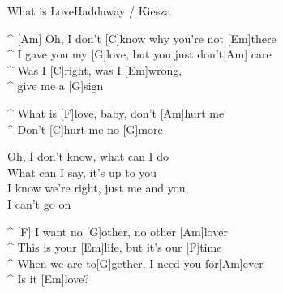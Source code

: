 \begin{song}{What is Love}{Haddaway / Kiesza}


\begin{guitar}
^ [Am]  Oh, I don't [C]know why you're not [Em]there \\
^ I gave you my [G]love, but you just don't[Am] care \\
^ Was I [C]right, was I [Em]wrong, \\
^ give me a [G]sign \\
\end{guitar}

\begin{guitar}
^ What is [F]love, baby, don't [Am]hurt me \\
^ Don't [C]hurt me no [G]more \\
\end{guitar}

\begin{guitar}
Oh, I don't know, what can I do \\
What can I say, it's up to you \\
I know we're right, just me and you, \\
I can't go on \\
\end{guitar}



\begin{guitar}
^ [F] I want no [G]other, no other [Am]lover \\
^ This is your [Em]life, but it's our [F]time \\
^ When we are to[G]gether, I need you for[Am]ever \\
^ Is it [Em]love?\\
\end{guitar}

\end{song}
